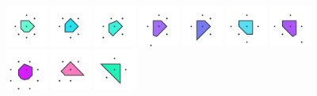 \documentclass[text.tex]{subfiles}
\begin{document}
\begin{figure}[h!]
\includegraphics[width=0.12\textwidth]{img/results/circle8/circle8_107106_(-11_5alpha_1)_005.pdf}
\includegraphics[width=0.12\textwidth]{img/results/circle8/circle8_107106_(-11_5alpha_1)_006.pdf}
\includegraphics[width=0.12\textwidth]{img/results/circle8/circle8_107106_(-11_5alpha_1)_007.pdf}
\includegraphics[width=0.12\textwidth]{img/results/circle8/circle8_107106_(-11_5alpha_1)_008.pdf}
\includegraphics[width=0.12\textwidth]{img/results/circle8/circle8_107106_(-11_5alpha_1)_009.pdf}
\includegraphics[width=0.12\textwidth]{img/results/circle8/circle8_107106_(-11_5alpha_1)_010.pdf}
\includegraphics[width=0.12\textwidth]{img/results/circle8/circle8_107106_(-11_5alpha_1)_011.pdf}
\includegraphics[width=0.12\textwidth]{img/results/circle8/circle8_107106_(-11_5alpha_1)_012.pdf}
\includegraphics[width=0.12\textwidth]{img/results/circle8/circle8_107106_(-11_5alpha_1)_013.pdf}
\includegraphics[width=0.12\textwidth]{img/results/circle8/circle8_107106_(-11_5alpha_1)_014.pdf}
\end{figure}
\end{document}
